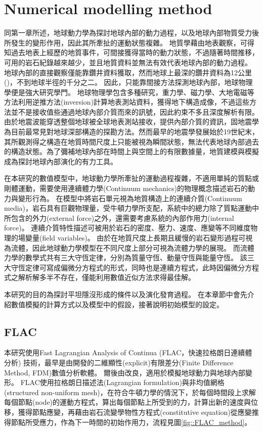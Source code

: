 
\chapter{Numerical modelling method}


同第一章所述，地球動力學為探討地球內部的動力過程，以及地球內部物質受力後所發生的變形作用，因此其所牽扯的運動狀態複雜。
地質學藉由地表觀察，可得知過去地表上經歷的地質事件，可間接獲得當時的動力狀態，不過隨著時間推移，可用的岩石紀錄越來越少，並且地質資料並無法有效代表地球內部的動力過程。
地球內部的直接觀察僅能靠鑽井資料獲取，然而地球上最深的鑽井資料為12公里(\citealp{ganchin1998seismic})，不到地球半徑的千分之二。
因此，只能靠間接方法探測地球內部，地球物理學便是強大研究學門。
地球物理學包含多種研究，重力學、磁力學、大地電磁等方法利用逆推方法(inversion)計算地表測站資料，獲得地下構造成像，不過這些方法並不是接收值些通過地球內部介質而來的訊號，因此約束不多且深度解析有限。
由於地震波能穿透整個地球被全球地表測站接收，提供內部介質的資訊，固地震學為目前最常見對地球深部構造的探勘方法。然而最早的地震學發展始於19世紀末，其所觀測得之構造在地質時間尺度上只能被視為瞬間狀態，無法代表地球內部過去的構造狀態。為了彌補地球內部在時間上與空間上的有限數據量，地質建模與模擬成為探討地球內部演化的有力工具。

在本研究的數值模型中，地球動力學所牽扯的運動過程複雜，不適用單純的質點或剛體運動，需要使用連續體力學(Continuum mechanics)的物理概念描述岩石的動力與變形行為。
在模型中將岩石單元視為地質構造上的連續介質(Continuum media)，岩石具有巨觀物理量，受牛頓力學所支配，系統中的總力除了質點運動中所包含的外力(external force)之外，還需要考慮系統的內部作用力(internal force)。
連續介質特性描述可被用於岩石的密度、壓力、速度、應變等不同維度物理的場變量(field variables)。
由於在地質尺度上長期且緩慢的岩石變形過程可視為流體，因此地球動力學模型在不同尺度上部分可視為流體力學的展現。
而流體力學的數學式共有三大守恆定律，分別為質量守恆、動量守恆與能量守恆。
該三大守恆定律可寫成偏微分方程式的形式，同時也是連續方程式，此時因偏微分方程式之解析解多半不存在，僅能利用數值近似方法求得最佳解。

本研究的目的為探討平坦隱沒形成的條件以及演化發育過程。
在本章節中會先介紹數值模擬的計算方式以及模型中的假設，接著說明初始模型的設定。

\section{FLAC}

本研究使用Fast Lagrangian Analysis of Continua (FLAC，快速拉格朗日連續體分析) 技術，最早是由\citealp{cundall1989numerical}開發的二維顯性(explicit)有限差分(Finite Difference Method, FDM)數值分析軟體。
爾後由\citealp{Lavier2000}改良，適用於模擬地球動力與地球內部變形。
FLAC使用拉格朗日描述法(Lagrangian formulation)與非均值網格(structured non-uniform mesh)，在符合牛頓力學的情況下，於每個時間段上求解每個節點(node)的運動方程式，算出每個節點上所受到的力，計算出新的速度與位移，獲得節點應變，再藉由岩石流變學物性方程式(constitutive equation)從應變推得節點所受應力，作為下一時間的初始作用力，流程見圖\ref{fig::FLAC_method}。

